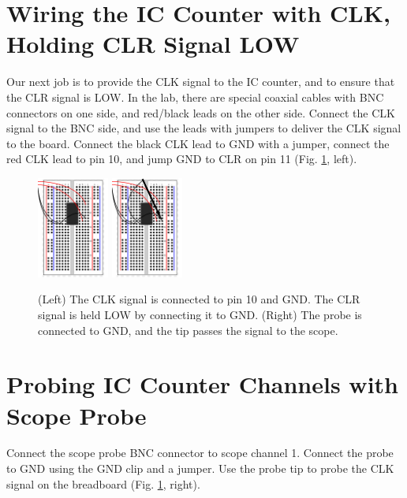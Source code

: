 \documentclass{article}
\begin{document}
\section{Wiring the IC Counter with CLK, Holding CLR Signal LOW}

Our next job is to provide the CLK signal to the IC counter, and to ensure that the CLR signal is LOW.  In the lab, there are special coaxial cables with BNC connectors on one side, and red/black leads on the other side.  Connect the CLK signal to the BNC side, and use the leads with jumpers to deliver the CLK signal to the board.  Connect the black CLK lead to GND with a jumper, connect the red CLK lead to pin 10, and jump GND to CLR on pin 11 (Fig. \ref{fig:count3}, left).

\begin{figure}[hb]
\centering
\includegraphics[width=0.21\textwidth]{breadboard_power_clk_reset.pdf}
\includegraphics[width=0.21\textwidth]{breadboard_power_clk_reset_probe.pdf}
\caption{\label{fig:count3} (Left) The CLK signal is connected to pin 10 and GND.  The CLR signal is held LOW by connecting it to GND. (Right) The probe is connected to GND, and the tip passes the signal to the scope.}
\end{figure}

\section{Probing IC Counter Channels with Scope Probe}

Connect the scope probe BNC connector to scope channel 1.  Connect the probe to GND using the GND clip and a jumper.  Use the probe tip to probe the CLK signal on the breadboard (Fig. \ref{fig:count3}, right).
\end{document}
